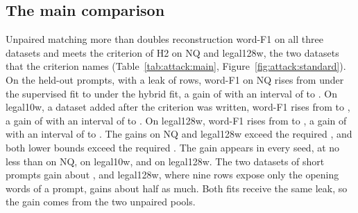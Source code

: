 \subsection{The main comparison}\label{sec:attack:main}

Unpaired matching more than doubles reconstruction word-F1 on all three datasets and meets the criterion of H2 on NQ and legal128w, the two datasets that the criterion names (Table~\ref{tab:attack:main}, Figure~\ref{fig:attack:standard}).
On the  held-out prompts, with a leak of  rows, word-F1 on NQ rises from  under the supervised fit to  under the hybrid fit, a gain of  with an interval of  to . %
On legal10w, a dataset added after the criterion was written, word-F1 rises from  to , a gain of  with an interval of  to . %
On legal128w, word-F1 rises from  to , a gain of  with an interval of  to . %
The gains on NQ and legal128w exceed the required , and both lower bounds exceed the required .
The gain appears in every seed, at no less than  on NQ,  on legal10w, and  on legal128w. %
The two datasets of short prompts gain about , and legal128w, where nine rows expose only the opening words of a prompt, gains about half as much.
Both fits receive the same leak, so the gain comes from the two unpaired pools.

